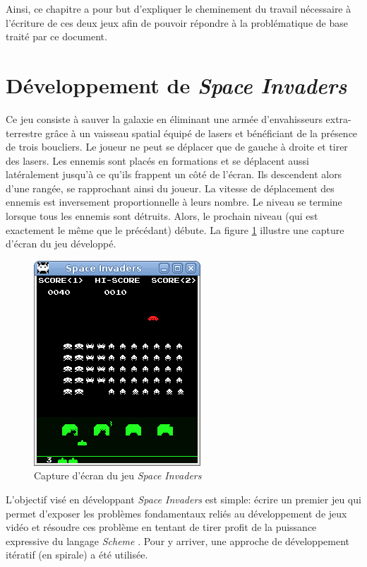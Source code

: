 \documentclass[12pt,twoside,letterpaper,francais]{book}
\newcommand{\si}{{\textit{Space Invaders }}}
\newcommand{\Schemelang}{{\textit{Scheme }}}
\begin{document}
Ainsi, ce chapitre a pour but d'expliquer le cheminement du travail
nécessaire à l'écriture de ces deux jeux afin de pouvoir répondre à la
problématique de base traité par ce document.


\FloatBarrier
\section{Développement de \si} \label{Exp:SI}
Ce jeu consiste à \og sauver la galaxie \fg en éliminant une armée
d'envahisseurs extra-terrestre grâce à un vaisseau spatial équipé de
lasers et bénéficiant de la présence de trois boucliers. Le joueur ne
peut se déplacer que de gauche à droite et tirer des lasers. Les
ennemis sont placés en formations et se déplacent aussi latéralement
jusqu'à ce qu'ils frappent un côté de l'écran. Ils descendent alors
d'une rangée, se rapprochant ainsi du joueur. La vitesse de
déplacement des ennemis est inversement proportionnelle à leurs
nombre. Le niveau se termine lorsque tous les ennemis sont
détruits. Alors, le prochain niveau (qui est exactement le même que le
précédant) débute. La figure \ref{Exp:si-screen} illustre une capture
d'écran du jeu développé.

\begin{figure}[htb!]
  \center
  \includegraphics[scale=0.7]{space-invaders-screenshot}
  \caption{Capture d'écran du jeu \si}
  \label{Exp:si-screen}
\end{figure}

L'objectif visé en développant \si est simple: écrire un premier jeu
qui permet d'exposer les problèmes fondamentaux reliés au
développement de jeux vidéo et résoudre ces problème en tentant de
tirer profit de la puissance expressive du langage \Schemelang. Pour y
arriver, une approche de développement itératif (en spirale) a été
utilisée.
\end{document}
